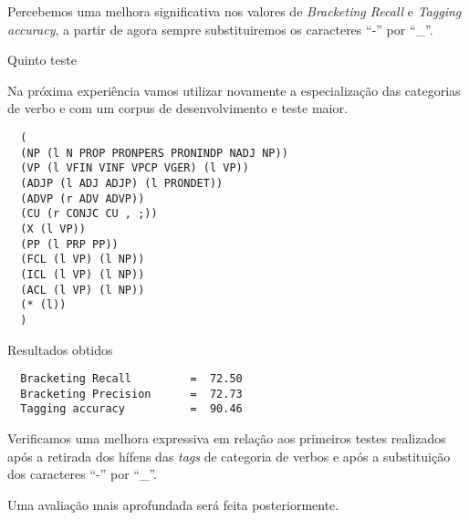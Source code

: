 \normalsize

Percebemos uma melhora significativa nos valores de \emph{Bracketing Recall} e \emph{Tagging accuracy}, a partir de agora sempre substituiremos os caracteres ``{-}'' por ``\_''.

Quinto teste

Na próxima experiência vamos utilizar novamente a especialização das categorias de verbo e com um corpus de desenvolvimento e teste maior.

\scriptsize

\begin{verbatim}
  (
  (NP (l N PROP PRONPERS PRONINDP NADJ NP))
  (VP (l VFIN VINF VPCP VGER) (l VP))
  (ADJP (l ADJ ADJP) (l PRONDET))
  (ADVP (r ADV ADVP))
  (CU (r CONJC CU , ;))
  (X (l VP))
  (PP (l PRP PP))
  (FCL (l VP) (l NP))
  (ICL (l VP) (l NP))
  (ACL (l VP) (l NP))
  (* (l))
  )
\end{verbatim}


Resultados obtidos


\begin{verbatim}
  Bracketing Recall         =  72.50
  Bracketing Precision      =  72.73
  Tagging accuracy          =  90.46
\end{verbatim}

\normalsize
Verificamos uma melhora expressiva em relação aos primeiros testes realizados após a retirada dos hífens das \emph{tags} de categoria de verbos e após a substituição dos caracteres ``{-}'' por ``\_''.

Uma avaliação mais aprofundada será feita posteriormente. 
